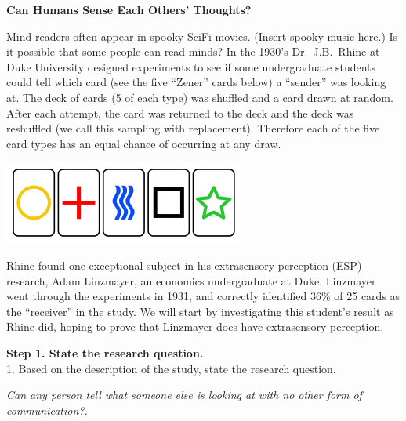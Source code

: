 \def\theTopic{ESP}
\def\dayNum{5}
\begin{center}
{\bf {\large Can Humans Sense Each Others' Thoughts?}}\\
\vspace{-.1in}
\end{center}


Mind readers often appear in spooky SciFi movies. (Insert spooky music
here.)  Is it
possible that some people can read minds? In the 1930's
Dr.~J.B.~Rhine at Duke University designed experiments to see if some
undergraduate students could tell which card (see the five ``Zener''
cards below) a ``sender'' was looking at. The deck of cards (5 of each
type) was shuffled and a card drawn at random. After each attempt, the
card was returned to the deck and the deck was reshuffled (we call
this sampling with replacement).  Therefore each of the five card types has
an equal chance of occurring at any draw. 
\begin{center}
  \includegraphics[width=.5\linewidth]{plots/Zener_cards.png}
\end{center}

 Rhine found one exceptional subject in his extrasensory perception
 (ESP) research, Adam Linzmayer, an economics undergraduate at Duke.
 Linzmayer went through the experiments in 1931, and correctly
 identified 36\% of 25 cards as the ``receiver'' in the study.   We will
 start by investigating this student's result as Rhine did, hoping to
 prove that Linzmayer does have extrasensory perception. 

{\bf Step 1. State the research question. }\\
1. Based on the description of the study, state the research question.
\begin{students}
  \vspace{2cm}
\end{students}

\begin{key}
{\it  Can any person tell what someone else is looking at with no
  other form of communication?.}
\end{key}



